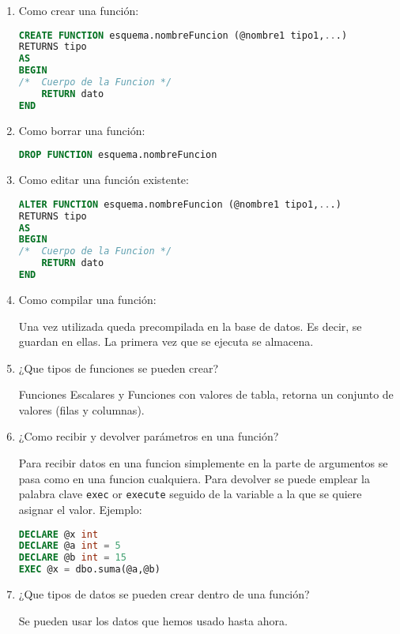 \begin{enumerate}
\item Como crear una función:

\begin{lstlisting}[language=SQL]
CREATE FUNCTION esquema.nombreFuncion (@nombre1 tipo1,...)
RETURNS tipo
AS
BEGIN
/* 	Cuerpo de la Funcion */
	RETURN dato
END
\end{lstlisting}
\item Como borrar una función:

\begin{lstlisting}[language=SQL]
DROP FUNCTION esquema.nombreFuncion
\end{lstlisting}

\item Como editar una función existente:

\begin{lstlisting}[language=SQL]
ALTER FUNCTION esquema.nombreFuncion (@nombre1 tipo1,...)
RETURNS tipo
AS
BEGIN
/* 	Cuerpo de la Funcion */
	RETURN dato
END
\end{lstlisting}

\item Como compilar una función:

Una vez utilizada queda precompilada en la base de datos. Es decir, se guardan en ellas. La primera vez que se ejecuta se almacena.

\item ¿Que tipos de funciones se pueden crear?

Funciones Escalares y Funciones con valores de tabla, retorna un conjunto de valores (filas y columnas).

\item ¿Como recibir y devolver parámetros en una función?

Para recibir datos en una funcion simplemente en la parte de argumentos se pasa como en una funcion cualquiera. Para devolver se puede emplear la palabra clave \texttt{exec} or \texttt{execute} seguido de la variable a la que se quiere asignar el valor. Ejemplo:

\begin{lstlisting}[language=SQL]
DECLARE @x int
DECLARE @a int = 5
DECLARE @b int = 15
EXEC @x = dbo.suma(@a,@b)
\end{lstlisting}

\item ¿Que tipos de datos se pueden crear dentro de una función?

Se pueden usar los datos que hemos usado hasta ahora.


\end{enumerate}
